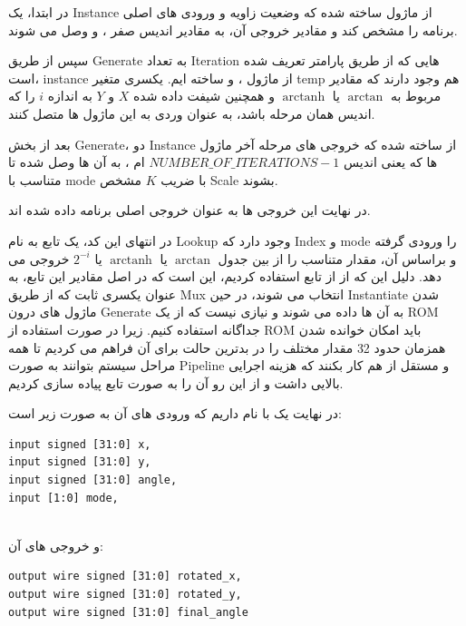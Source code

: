 \documentclass[12pt,titlepage,a4page , tikz , multi,table , svgnames,xcdraw]{article}
\DeclareMathOperator\arctanh{arctanh}
\begin{document}
در ابتدا، یک Instance از ماژول  ساخته شده که وضعیت زاویه و ورودی های اصلی برنامه را مشخص کند و مقادیر خروجی آن، به مقادیر اندیس صفر  ،  و  وصل می شوند.

سپس از طریق Generate به تعداد Iteration هایی که از طریق پارامتر تعریف شده است، instance از ماژول ،  و  ساخته ایم. یکسری متغیر temp هم وجود دارند که مقادیر مربوط به $\arctan$ یا $\arctanh$ و همچنین شیفت داده شده $X$ و $Y$ به اندازه $i$ را که اندیس همان مرحله باشد، به عنوان وردی به این ماژول ها متصل کنند.

بعد از بخش Generate، دو Instance از  ساخته شده که خروجی های مرحله آخر ماژول ها که یعنی اندیس
$NUMBER\_OF\_ITERATIONS - 1$
ام
 ،
   به آن ها وصل شده تا متناسب با mode با ضریب $K$ مشخص Scale بشوند.

در نهایت این خروجی ها به عنوان خروجی اصلی برنامه داده شده اند.

در انتهای این کد، یک تابع به نام Lookup وجود دارد که Index و mode را ورودی گرفته و براساس آن، مقدار متناسب را از بین جدول $\arctan$ یا $\arctanh$ یا $2^{-i}$ خروجی می دهد. دلیل این که از از تابع استفاده کردیم، این است که در اصل مقادیر این تابع، به عنوان یکسری ثابت که از طریق Mux انتخاب می شوند، در حین Instantiate شدن ماژول های درون Generate به آن ها داده می شوند و نیازی نیست که از یک ROM جداگانه استفاده کنیم. زیرا در صورت استفاده از ROM باید امکان خوانده شدن همزمان حدود 32 مقدار مختلف را در بدترین حالت برای آن فراهم می کردیم تا همه مراحل سیستم بتوانند به صورت Pipeline و مستقل از هم کار بکنند که هزینه اجرایی بالایی داشت و از این رو آن را به صورت تابع پیاده سازی کردیم.


\hrulefill

\newpage
در نهایت یک  با نام  داریم که ورودی های آن به صورت زیر است:

\begin{latin}

\begin{verbatim}
input signed [31:0] x,
input signed [31:0] y,
input signed [31:0] angle,
input [1:0] mode,
   
\end{verbatim}

\end{latin}


و خروجی های آن:


\begin{latin}

\begin{verbatim}
output wire signed [31:0] rotated_x,
output wire signed [31:0] rotated_y,
output wire signed [31:0] final_angle
   
\end{verbatim}

\end{latin}
\end{document}
